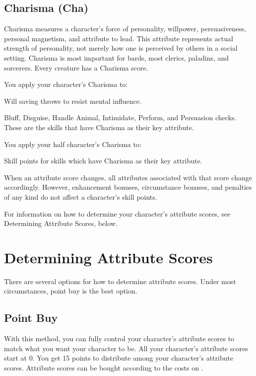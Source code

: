 \subsection{Charisma (Cha)}
Charisma measures a character's force of personality, willpower, persuasiveness, personal magnetism, and attribute to lead. This attribute represents actual strength of personality, not merely how one is perceived by others in a social setting. Charisma is most important for bards, most clerics, paladins, and sorcerers. Every creature has a Charisma score.

You apply your character's Charisma to:
\begin{itemize*}
\item Will saving throws to resist mental influence.
\item Bluff, Disguise, Handle Animal, Intimidate, Perform, and Persuasion checks. These are the skills that have Charisma as their key attribute.
\end{itemize*}
You apply your half character's Charisma to:
\begin{itemize*}
\item Skill points for skills which have Charisma as their key attribute.
\end{itemize*}

When an attribute score changes, all attributes associated with that score change accordingly. However, enhancement bonuses, circumstance bonuses, and penalties of any kind do not affect a character's skill points.

For information on how to determine your character's attribute scores, see Determining Attribute Scores, below.

\section{Determining Attribute Scores}
There are several options for how to determine attribute scores. Under most circumstances, point buy is the best option.

\subsection{Point Buy}
With this method, you can fully control your character's attribute scores to match what you want your character to be. All your character's attribute scores start at 0. You get 15 points to distribute among your character's attribute scores. Attribute scores can be bought according to the costs on .

